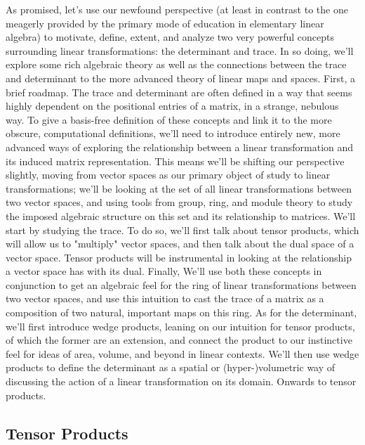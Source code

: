 \documentclass{article}
\newcommand{\nn}{\leavevmode \newline \newline}
\begin{document}
As promised, let's use our newfound perspective (at least in contrast to the one meagerly provided by the primary mode of education in elementary linear algebra) to motivate, define, extent, and analyze two very powerful concepts surrounding linear transformations: the determinant and trace. In so doing, we'll explore some rich algebraic theory as well as the connections between the trace and determinant to the more advanced theory of linear maps and spaces.
\nn
First, a brief roadmap. The trace and determinant are often defined in a way that seems highly dependent on the positional entries of a matrix, in a strange, nebulous way. To give a basis-free definition of these concepts and link it to the more obscure, computational definitions, we'll need to introduce entirely new, more advanced ways of exploring the relationship between a linear transformation and its induced matrix representation. This means we'll be shifting our perspective slightly, moving from vector spaces as our primary object of study to linear transformations; we'll be looking at the set of all linear transformations between two vector spaces, and using tools from group, ring, and module theory to study the imposed algebraic structure on this set and its relationship to matrices. We'll start by studying the trace. To do so, we'll first talk about tensor products, which will allow us to "multiply" vector spaces, and then talk about the dual space of a vector space. Tensor products will be instrumental in looking at the relationship a vector space has with its dual. Finally, We'll use both these concepts in conjunction to get an algebraic feel for the ring of linear transformations between two vector spaces, and use this intuition to cast the trace of a matrix as a composition of two natural, important maps on this ring. As for the determinant, we'll first introduce wedge products, leaning on our intuition for tensor products, of which the former are an extension, and connect the product to our instinctive feel for ideas of area, volume, and beyond in linear contexts. We'll then use wedge products to define the determinant as a spatial or (hyper-)volumetric way of discussing the action of a linear transformation on its domain.
\nn
Onwards to tensor products.

\subsection{Tensor Products}
\end{document}
